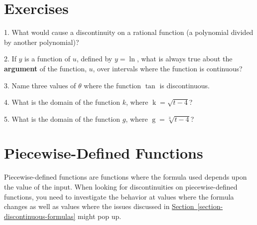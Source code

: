 \documentclass[12pt,]{book}
\newcommand{\terminology}[1]{\textbf{#1}}
\theoremstyle{plain}
\theoremstyle{definition}
\numberwithin{equation}{section}
\providecommand\phantomsection{}
\newcommand{\fe}[2]{\mathop{{#1}{\left(#2\right)}}}
\begin{document}
\section*{Exercises}\label{exercises-15}

\begin{exerciselist}
\item[1.]\phantomsection\hypertarget{exercise-107}{\null}What would cause a discontinuity on a rational function (a polynomial divided by another polynomial)?%
\par\smallskip
\item[2.]\phantomsection\hypertarget{exercise-108}{\null}If \(y\) is a function of \(u\), defined by \(y=\fe{\ln}{u}\), what is always true about the \terminology{argument} of the function, \(u\), over intervals where the function is continuous?%
\par\smallskip
\item[3.]\phantomsection\hypertarget{exercise-109}{\null}Name three values of \(\theta\) where the function \(\fe{\tan}{\theta}\) is discontinuous.%
\par\smallskip
\item[4.]\phantomsection\hypertarget{exercise-110}{\null}What is the domain of the function \(k\), where \(\fe{k}{t}=\sqrt{t-4}\)?%
\par\smallskip
\item[5.]\phantomsection\hypertarget{exercise-111}{\null}What is the domain of the function \(g\), where \(\fe{g}{t}=\sqrt[3]{t-4}\)?%
\par\smallskip
\end{exerciselist}
\typeout{************************************************}
\typeout{************************************************}
\section[Piecewise-Defined Functions]{Piecewise-Defined Functions}\label{section-piecewise-defined-functions}
Piecewise-defined functions are functions where the formula used depends upon the value of the input. When looking for discontinuities on piecewise-defined functions, you need to investigate the behavior at values where the formula changes as well as values where the issues discussed in \hyperref[section-discontinuous-formulas]{Section~\ref*{section-discontinuous-formulas}} might pop up.%
\typeout{************************************************}
\typeout{************************************************}
\end{document}
